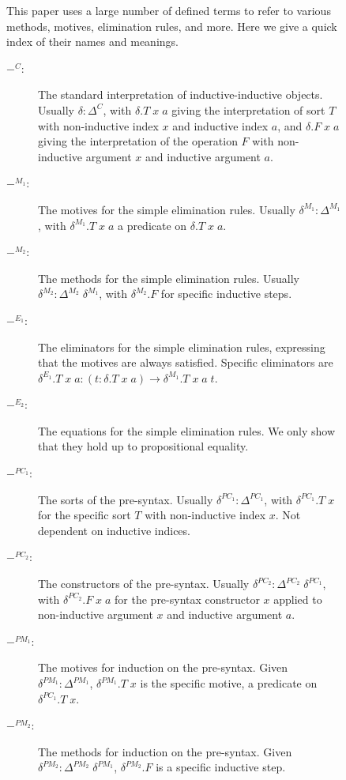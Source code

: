 \documentclass[acmsmall,review]{acmart}\settopmatter{printfolios=true,printccs=false,printacmref=false}
\begin{document}
\begin{figure}[htpb]
    \begin{flushleft}
        This paper uses a large number of defined terms to refer to various methods, motives, elimination rules, and more. Here we give a quick index of their names and meanings.
    \end{flushleft}
    
    \begin{description}
        \item[$-^C$:] The standard interpretation of inductive-inductive objects. Usually $\delta : \Delta^C$, with $\delta.T\;x\;a$ giving the interpretation of sort $T$ with non-inductive index $x$ and inductive index $a$, and $\delta.F\;x\;a$ giving the interpretation of the operation $F$ with non-inductive argument $x$ and inductive argument $a$.
        \item[$-^{M_1}$:] The motives for the simple elimination rules. Usually $\delta^{M_1} : \Delta^{M_1}$, with $\delta^{M_1}.T\;x\;a$ a predicate on $\delta.T\;x\;a$.
        \item[$-^{M_2}$:] The methods for the simple elimination rules. Usually $\delta^{M_2} : \Delta^{M_2}\;\delta^{M_1}$, with $\delta^{M_2}.F$ for specific inductive steps.
        \item[$-^{E_1}$:] The eliminators for the simple elimination rules, expressing that the motives are always satisfied. Specific eliminators are $\delta^{E_1}.T\;x\;a : (t : \delta.T\;x\;a) \to \delta^{M_1}.T\;x\;a\;t$.
        \item[$-^{E_2}$:] The equations for the simple elimination rules. We only show that they hold up to propositional equality.
        \item[$-^{PC_1}$:] The sorts of the pre-syntax. Usually $\delta^{PC_1} : \Delta^{PC_1}$, with $\delta^{PC_1}.T\;x$ for the specific sort $T$ with non-inductive index $x$. Not dependent on inductive indices.
        \item[$-^{PC_2}$:] The constructors of the pre-syntax. Usually $\delta^{PC_2} : \Delta^{PC_2}\;\delta^{PC_1}$, with $\delta^{PC_2}.F\;x\;a$ for the pre-syntax constructor $x$ applied to non-inductive argument $x$ and inductive argument $a$.
        \item[$-^{PM_1}$:] The motives for induction on the pre-syntax. Given $\delta^{PM_1} : \Delta^{PM_1}$, $\delta^{PM_1}.T\;x$ is the specific motive, a predicate on $\delta^{PC_1}.T\;x$.
        \item[$-^{PM_2}$:] The methods for induction on the pre-syntax. Given $\delta^{PM_2} : \Delta^{PM_2}\;\delta^{PM_1}$, $\delta^{PM_2}.F$ is a specific inductive step.

\end{description}
\end{figure}
\end{document}

